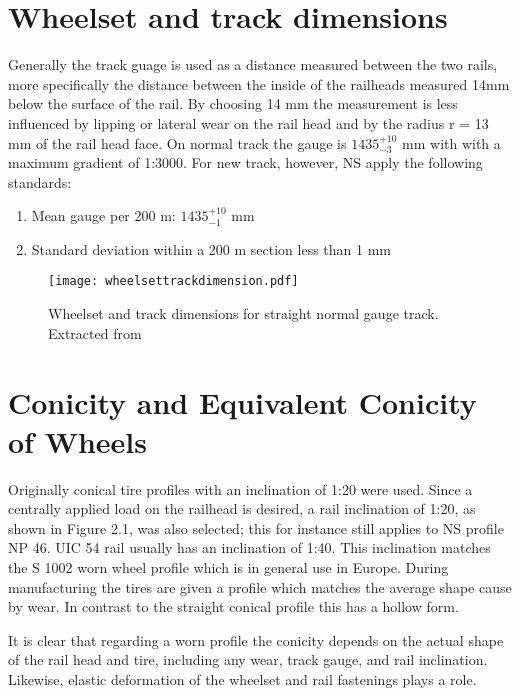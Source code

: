 \section{Wheelset and track dimensions}

Generally the track guage is used as a distance measured between the two rails, more specifically the distance between the inside of the railheads measured 14mm below the surface of the rail. By choosing 14 mm the measurement is less influenced by lipping or lateral wear on the rail head and by the radius r = 13 mm of the rail head face. On normal track the gauge is $1435^{+10}_{-3}$ mm with with a maximum gradient of 1:3000. For new track, however, NS apply the following standards:

\begin{enumerate}
\item Mean gauge per 200 m: $1435^{+10}_{-1}$ mm
\item Standard deviation within a 200 m section less than 1 mm
\end{enumerate}

\begin{figure}[h]
\centering
\texttt{[image: wheelsettrackdimension.pdf]}
\caption{Wheelset and track dimensions for straight normal gauge track. Extracted from \cite[p.17]{esveld2001modern}}
\label{fig:wheelset and track dimensions}
\end{figure}


\section{Conicity and Equivalent Conicity of Wheels}

Originally conical tire profiles with an inclination of 1:20 were used. Since a centrally applied load on the railhead is desired, a rail inclination of 1:20, as shown in Figure 2.1, was also selected; this for instance still applies to NS profile NP 46. UIC 54 rail usually has an inclination of 1:40. This inclination matches the S 1002 worn wheel profile which is in general use in Europe. During manufacturing the tires are given a profile which matches the average shape cause by wear. In contrast to the straight conical profile this has a hollow form.

It is clear that regarding a worn profile the conicity depends on the actual shape of the rail head and tire, including any wear, track gauge, and rail inclination. Likewise, elastic deformation of the wheelset and rail fastenings plays a role.

